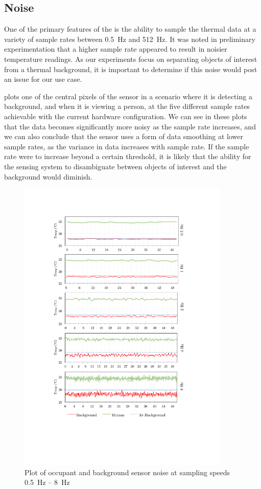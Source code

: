 \documentclass[../thesis/thesis.tex]{subfiles}
\begin{document}
\subsection{Noise}

One of the primary features of the \mlx is the ability to sample the thermal data at a variety of sample rates between 0.5~Hz and 512~Hz. It was noted in preliminary experimentation that a higher sample rate appeared to result in noisier temperature readings. As our experiments focus on separating objects of interest from a thermal background, it is important to determine if this noise would post an issue for our use case.

 plots one of the central pixels of the sensor in a scenario where it is detecting a background, and when it is viewing a person, at the five different sample rates achievable with the current hardware configuration. We can see in these plots that the data becomes significantly more noisy as the sample rate increases, and we can also conclude that the sensor uses a form of data smoothing at lower sample rates, as the variance in data increases with sample rate. If the sample rate were to increase beyond a certain threshold, it is likely that the ability for the sensing system to disambiguate between objects of interest and the background would diminish.

\begin{figure}
  \centering
  \includegraphics[width=0.9\textwidth]{../diagrams/noise-graph3.pdf}
  \caption{Plot of occupant and background sensor noise at sampling speeds 0.5~Hz -- 8~Hz}
  \label{fig:noise} %
\end{figure}
\end{document}
